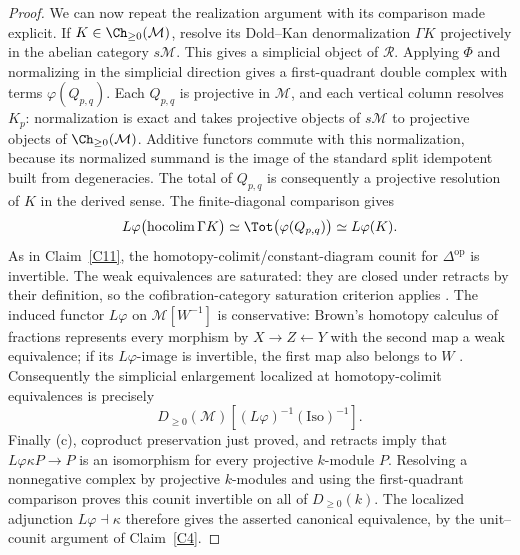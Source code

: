 \begin{proof}
We can now repeat the realization argument with its comparison made explicit. If $K\in\Ch_{\geq0}(\mathcal M)$, resolve its Dold--Kan denormalization $\Gamma K$ projectively in the abelian category $s\mathcal M$. This gives a simplicial object of $\mathcal R$. Applying $\Phi$ and normalizing in the simplicial direction gives a first-quadrant double complex with terms $\varphi(Q_{p,q})$. Each $Q_{p,q}$ is projective in $\mathcal M$, and each vertical column resolves $K_p$: normalization is exact and takes projective objects of $s\mathcal M$ to projective objects of $\Ch_{\geq0}(\mathcal M)$. Additive functors commute with this normalization, because its normalized summand is the image of the standard split idempotent built from degeneracies. The total of $Q_{p,q}$ is consequently a projective resolution of $K$ in the derived sense. The finite-diagonal comparison gives
\[
 L\varphi\bigl(\operatorname{hocolim}\Gamma K\bigr)
 \simeq\Tot\bigl(\varphi(Q_{p,q})\bigr)
 \simeq L\varphi(K).
\]
As in Claim~\ref{C11}, the homotopy-colimit/constant-diagram counit for $\Delta^{\mathrm{op}}$ is invertible. The weak equivalences are saturated: they are closed under retracts by their definition, so the cofibration-category saturation criterion applies \citep[Theorem 7.2.7]{RadulescuBanu2009}. The induced functor $L\varphi$ on $\mathcal M[W^{-1}]$ is conservative: Brown's homotopy calculus of fractions represents every morphism by $X\to Z\leftarrow Y$ with the second map a weak equivalence; if its $L\varphi$-image is invertible, the first map also belongs to $W$ \citep[Theorem 6.4.4]{RadulescuBanu2009}. Consequently the simplicial enlargement localized at homotopy-colimit equivalences is precisely
\[
 D_{\geq0}(\mathcal M)[(L\varphi)^{-1}(\mathrm{Iso})^{-1}].
\]
Finally (c), coproduct preservation just proved, and retracts imply that $L\varphi\kappa P\to P$ is an isomorphism for every projective $k$-module $P$. Resolving a nonnegative complex by projective $k$-modules and using the first-quadrant comparison proves this counit invertible on all of $D_{\geq0}(k)$. The localized adjunction $L\varphi\dashv\kappa$ therefore gives the asserted canonical equivalence, by the unit--counit argument of Claim~\ref{C4}.
\end{proof}
